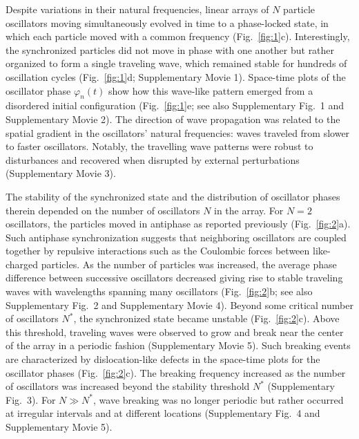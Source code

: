 Despite variations in their natural frequencies, linear arrays of $N$ particle oscillators moving simultaneously evolved in time to a phase-locked state, in which each particle moved with a common frequency (Fig.~\ref{fig:1}c). Interestingly, the synchronized particles did not move in phase with one another but rather organized to form a single traveling wave, which remained stable for hundreds of oscillation cycles (Fig.~\ref{fig:1}d; Supplementary Movie 1). Space-time plots of the oscillator phase $\varphi_n(t)$ show how this wave-like pattern emerged from a disordered initial configuration (Fig.~\ref{fig:1}e; see also Supplementary Fig.~1 and Supplementary Movie 2). The direction of wave propagation was related to the spatial gradient in the oscillators' natural frequencies: waves traveled from slower to faster oscillators. Notably, the travelling wave patterns were robust to disturbances and recovered when disrupted by external perturbations (Supplementary Movie 3).


The stability of the synchronized state and the distribution of oscillator phases therein depended on the number of oscillators $N$ in the array. For $N=2$ oscillators, the particles moved in antiphase as reported previously \autocite{Mersch2011} (Fig.~\ref{fig:2}a). Such antiphase synchronization suggests that neighboring oscillators are coupled together by repulsive interactions such as the Coulombic forces between like-charged particles. As the number of particles was increased, the average phase difference between successive oscillators decreased giving rise to stable traveling waves with wavelengths spanning many oscillators (Fig.~\ref{fig:2}b; see also Supplementary Fig.~2 and Supplementary Movie 4). Beyond some critical number of oscillators $N^*$, the synchronized state became unstable (Fig.~\ref{fig:2}c). Above this threshold, traveling waves were observed to grow and break near the center of the array in a periodic fashion (Supplementary Movie 5). Such breaking events are characterized by dislocation-like defects in the space-time plots for the oscillator phases (Fig.~\ref{fig:2}c). The breaking frequency increased as the number of oscillators was increased beyond the stability threshold $N^*$ (Supplementary Fig.~3). For $N\gg N^*$, wave breaking was no longer periodic but rather occurred at irregular intervals and at different locations (Supplementary Fig.~4 and Supplementary Movie 5).
    
